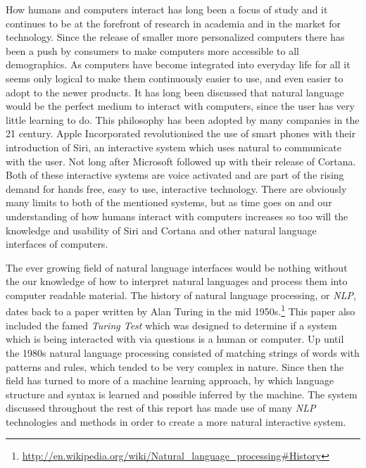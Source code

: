 \documentclass[12pt]{article}
\begin{document}
How humans and computers interact has long been a focus of study\cite{biermann} and it continues to be at the forefront of research in academia and in the market for technology. Since the release of smaller more personalized computers there has been a push by consumers to make computers more accessible to all demographics. As computers have become integrated into everyday life for all it seems only logical to make them continuously easier to use, and even easier to adopt to the newer products. It has long been discussed that natural language would be the perfect medium to interact with computers, since the user has very little learning to do.\cite{kelly}\cite{aggarwal}\cite{ogden} This philosophy has been adopted by many companies in the 21 century. Apple Incorporated revolutionised the use of smart phones with their introduction of Siri, an interactive system which uses natural to communicate with the user. Not long after Microsoft followed up with their release of Cortana. Both of these interactive systems are voice activated and are part of the rising demand for hands free, easy to use, interactive technology. There are obviously many limits to both of the mentioned systems, but as time goes on and our understanding of how humans interact with computers increases so too will the knowledge and usability of Siri and Cortana and other natural language interfaces of computers.\cite{thompson}


The ever growing field of natural language interfaces would be nothing without the our knowledge of how to interpret natural languages and process them into computer readable material. The history of natural language processing, or {\it NLP}, dates back to a paper written by Alan Turing in the mid 1950s.\footnote{\url{http://en.wikipedia.org/wiki/Natural_language_processing#History}} This paper also included the famed {\it Turing Test} which was designed to determine if a system which is being interacted with via questions is a human or computer. Up until the 1980s natural language processing consisted of matching strings of words with patterns and rules, which tended to be very complex in nature. Since then the field has turned to more of a machine learning approach, by which language structure and syntax is learned and possible inferred by the machine.\cite{socher} The system discussed throughout the rest of this report has made use of many {\it NLP} technologies and methods in order to create a more natural interactive system.
\end{document}
